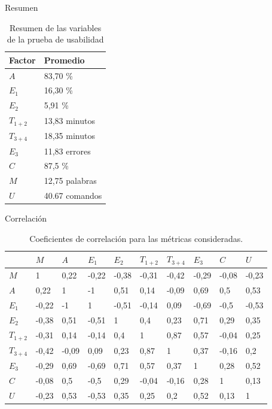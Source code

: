 \begin{frame}{Resumen}
\begin{table}[H]
\centering
\footnotesize
\caption{Resumen de las variables de la prueba de usabilidad}
\begin{tabular}{|p{1.2cm}|p{2.4cm}|}
\hline
Factor  &   Promedio \\
\hline
$A$  &      83,70 \%     \\
$E_1$ &     16,30 \%  \\
$E_2$  &    5,91  \%  \\
$T_{1+2}$ & 13,83  minutos  \\
$T_{3+4}$ & 18,35  minutos  \\
$E_3$ &     11,83  errores  \\
$C$ &       87,5   \%  \\
$M$ &       12,75  palabras  \\
$U$ &       40.67  comandos  \\
\hline  
\end{tabular}
\label{sec:tabla-resumen-prueba}
\end{table}

\end{frame}

\begin{frame}{Correlación}
\begin{table}[H] 
\centering
\footnotesize
\begin{tabular}{|p{0.7cm}|p{0.7cm}|p{0.7cm}|p{0.7cm}|p{0.7cm}|p{0.7cm}|p{0.7cm}|p{0.7cm}|p{0.7cm}|p{0.7cm}|}
\hline
& $M$ &  $A$  &   $E_1$ &  $E_2$  &  $T_{1+2}$  & $T_{3+4}$     & $E_3$ & $C$ & $U$ \\
\hline
$M$       &  1     &  0,22  & -0,22  & -0,38  &  -0,31  &  -0,42  &  -0,29 & -0,08    &  -0,23 \\
$A$       &  0,22  &  1  &  -1  &  0,51  &  0,14  &  -0,09  &  0,69  &  0,5           &  0,53 \\
$E_1$     &  -0,22 &  -1  &  1  &  -0,51  &  -0,14  &  0,09  &  -0,69  &  -0,5        &  -0,53 \\
$E_2$     &  -0,38 &  0,51  &  -0,51  &  1  &  0,4  &  0,23  &  0,71  &  0,29         &  0,35  \\
$T_{1+2}$ &  -0,31 &  0,14  &  -0,14  &  0,4  &  1  &  0,87  &  0,57  &  -0,04        &  0,25 \\
$T_{3+4}$ &  -0,42 &  -0,09  &  0,09  &  0,23  &  0,87  &  1  &  0,37  &  -0,16       &  0,2 \\
$E_3$     &  -0,29 &  0,69  &  -0,69  &  0,71  &  0,57  &  0,37  &  1  &  0,28        &  0,52 \\
$C$       &  -0,08 &  0,5  &  -0,5  &  0,29  &  -0,04  &  -0,16  &  0,28  &  1        &  0,13 \\
$U$       &  -0,23 &  0,53  &  -0,53  &  0,35  &  0,25  &  0,2  &  0,52  &  0,13      &  1 \\
\hline
\end{tabular}
\caption{Coeficientes de correlaci\'on para las m\'etricas consideradas.}
\label{sec:tabla-correlacion}
\end{table}

\end{frame}


